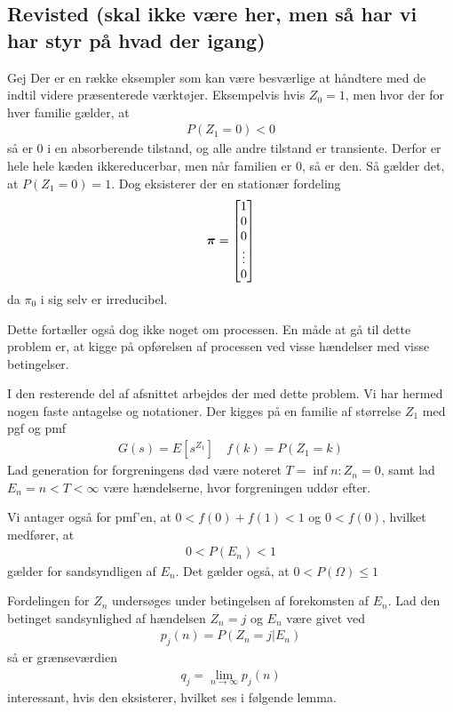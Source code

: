\subsection{Revisted (skal ikke være her, men så har vi har styr på hvad der igang)}
Gej
Der er en række eksempler som kan være besværlige at håndtere med de indtil videre præsenterede værktøjer.
Eksempelvis hvis $Z_0=1$, men hvor der for hver familie gælder, at   
\begin{align*}
P(Z_1=0)<0    
\end{align*}
så er $0$ i en absorberende tilstand, og alle andre tilstand er transiente. Derfor er hele hele kæden ikkereducerbar, men  %
 når familien er $0$, så er den. Så gælder det, at $P(Z_1=0)=1$. Dog eksisterer der en stationær fordeling 
\begin{align*}
    \boldsymbol{\pi}=\begin{bmatrix}
1\\
0\\
0\\
\vdots\\
0
\end{bmatrix}
\end{align*}
da $\pi_0$ i sig selv er irreducibel.  

Dette fortæller også dog ikke noget om processen. En måde at gå til dette problem er, at kigge på opførelsen af processen ved visse hændelser med visse betingelser. 

I den resterende del af afsnittet arbejdes der med dette problem. Vi har hermed nogen faste antagelse og notationer. Der kigges på en familie af størrelse $Z_1$ med pgf og pmf 
\begin{align*}
    G(s)=E[s^{Z_1}] \quad f(k)=P(Z_1=k)
\end{align*} 
Lad generation for forgreningens død være noteret $T=\inf{n:Z_n=0}$, samt  
lad $E_n={n<T<\infty}$
være hændelserne, hvor forgreningen uddør efter. 

Vi antager også for pmf'en, at $0<f(0)+f(1)<1$ og $0<f(0)$, hvilket medfører, at 
\begin{align*}
    0<P(E_n)<1    
\end{align*}
gælder for sandsyndligen af $E_n$. Det gælder også, at $0< P(\Omega)\leq 1$

Fordelingen for $Z_n$ undersøges under betingelsen af forekomsten af $E_n$. Lad den betinget sandsynlighed af hændelsen $Z_n=j$ og $E_n$ være givet ved 
\begin{align*}
    p_j(n)=P(Z_n=j | E_n)
\end{align*}
så er grænseværdien 
\begin{align*}
q_j=\lim_{n\to \infty} p_j(n)    
\end{align*}
interessant, hvis den eksisterer, hvilket ses i følgende lemma. 

